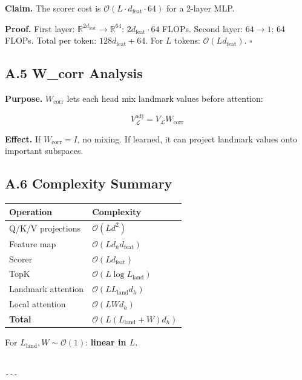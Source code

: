 \textbf{Claim.} The scorer cost is $\mathcal{O}(L \cdot d_\text{feat} \cdot 64)$ 
for a 2-layer MLP.

\textbf{Proof.} First layer: $\mathbb{R}^{2 d_\text{feat}} \to \mathbb{R}^{64}$: 
$2 d_\text{feat} \cdot 64$ FLOPs. Second layer: $64 \to 1$: 64 FLOPs. Total 
per token: $128 d_\text{feat} + 64$. For $L$ tokens: $\mathcal{O}(L d_\text{feat})$. $\square$

\subsection{A.5 W\_corr Analysis}

\textbf{Purpose.} $W_\text{corr}$ lets each head mix landmark values before 
attention:

\[
V_\mathcal{L}^\text{adj} = V_\mathcal{L} W_\text{corr}
\tag{A.7}
\]

\textbf{Effect.} If $W_\text{corr} = I$, no mixing. If learned, it can project 
landmark values onto important subspaces.

\subsection{A.6 Complexity Summary}

\begin{table}[H]
\centering
\small
\begin{tabular}{ll}
\toprule
\textbf{Operation} & \textbf{Complexity} \\
\midrule
Q/K/V projections & $\mathcal{O}(L d^2)$ \\
Feature map & $\mathcal{O}(L d_h d_\text{feat})$ \\
Scorer & $\mathcal{O}(L d_\text{feat})$ \\
TopK & $\mathcal{O}(L \log L_\text{land})$ \\
Landmark attention & $\mathcal{O}(L L_\text{land} d_h)$ \\
Local attention & $\mathcal{O}(L W d_h)$ \\
\textbf{Total} & $\mathcal{O}(L(L_\text{land} + W) d_h)$ \\
\bottomrule
\end{tabular}
\end{table}

For $L_\text{land}, W \sim \mathcal{O}(1)$: \textbf{linear in $L$}.
\begin{lstlisting}

---
\end{lstlisting}

